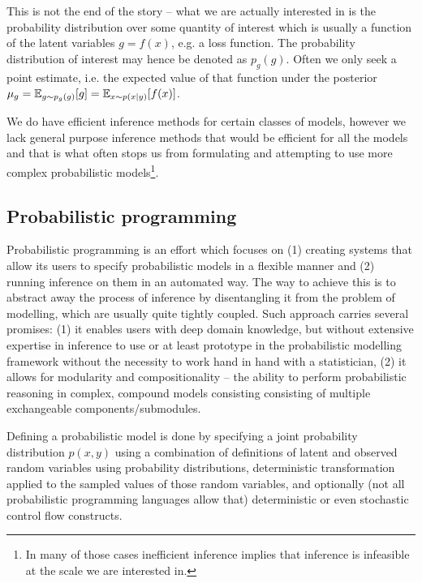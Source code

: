 \documentclass[12pt]{article}
\begin{document}
This is not the end of the story -- 
what we are actually interested in is the probability distribution over some quantity of interest which is usually a function of the latent variables $g=f(x)$, e.g. a loss function.
The probability distribution of interest may hence be denoted as $p_g(g)$.
Often we only seek a point estimate, i.e. the expected value of that function under the posterior $\mu_g=\mathbb{E}_{g \sim p_g(g)}[g]=\mathbb{E}_{x \sim p(x|y)}[f(x)]$.


We do have efficient inference methods for certain classes of models, however we lack general purpose inference methods that would be efficient for all the models and that is what often stops us from formulating and attempting to use more complex probabilistic 
models\footnote{In many of those cases inefficient inference implies that inference is infeasible at the scale we are interested in.}.


\subsection{Probabilistic programming}
Probabilistic programming is an effort which focuses on 
(1) creating systems that allow its users to specify probabilistic models in a flexible manner 
and 
(2) running inference on them in an automated way.
The way to achieve this is to abstract away the process of inference by disentangling it from the problem of modelling, which are usually quite tightly coupled.
Such approach carries several promises:
(1) it enables users with deep domain knowledge, but without extensive expertise in inference to use or at least prototype in the probabilistic modelling framework without the necessity to work hand in hand with a statistician,
(2) it allows for modularity and compositionality -- the ability to perform probabilistic reasoning in complex, compound models consisting consisting of multiple exchangeable components/submodules.

Defining a probabilistic model is done by specifying a joint probability distribution $p(x,y)$ using a combination of 
definitions of latent and observed random variables using probability distributions, 
deterministic transformation applied to the sampled values of those random variables, 
and optionally (not all probabilistic programming languages 
allow that) 
deterministic or even stochastic control flow constructs.  
\end{document}
